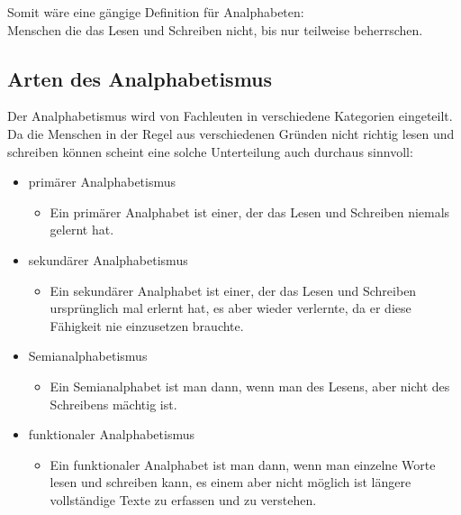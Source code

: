 Somit wäre eine gängige Definition für Analphabeten:\\

Menschen die das Lesen und Schreiben nicht, bis nur teilweise beherrschen.


\subsection{Arten des Analphabetismus}


Der Analphabetismus wird von Fachleuten in verschiedene Kategorien eingeteilt. Da die Menschen in der Regel aus verschiedenen Gründen nicht richtig lesen und schreiben können scheint eine solche Unterteilung auch durchaus sinnvoll:


\begin{itemize}

	\item primärer Analphabetismus

				\begin{itemize}

					  \item Ein primärer Analphabet ist einer, der das Lesen und Schreiben niemals gelernt hat.

				\end{itemize}

	\item sekundärer Analphabetismus

				\begin{itemize}

					  \item Ein sekundärer Analphabet ist einer, der das Lesen und Schreiben ursprünglich mal erlernt hat, es aber wieder verlernte, da er diese Fähigkeit nie einzusetzen brauchte.

				\end{itemize}

	\item Semianalphabetismus

				\begin{itemize}

					  \item Ein Semianalphabet ist man dann, wenn man des Lesens, aber nicht des Schreibens mächtig ist.

				\end{itemize}

	\item funktionaler Analphabetismus

				\begin{itemize}

					  \item Ein funktionaler Analphabet ist man dann, wenn man einzelne Worte lesen und schreiben kann, es einem aber nicht möglich ist längere vollständige Texte zu erfassen und zu verstehen.

				\end{itemize}

\end{itemize}

